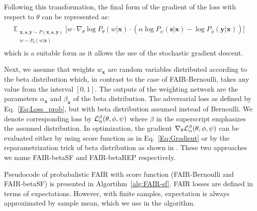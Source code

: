\documentclass[preprint,12pt]{elsarticle}
\begin{document}
Following this transformation, the final form of the gradient of the loss with respect to $\theta$ can be represented as:
\begin{align}
\label{Eq:Gradient}
\begin{split}
\mathbb{E}_{\substack{\mathbf{x}, \mathbf{s}, \mathbf{y}\sim P(\mathbf{x},\mathbf{s}, \mathbf{y})\\w \sim P_\theta(w|\mathbf{x})}} \Big[w\cdot \nabla_{\theta}  \log P_\theta(w|\mathbf{x}) \cdot (\alpha\log P_\psi(\mathbf{s}|\mathbf{x}) - \log P_\phi(\mathbf{y}|\mathbf{x})) \Big]
\end{split}
\end{align}
which is a suitable form as it allows the use of the stochastic gradient descent.

Next, we assume that weights $w_\mathbf{x}$ are random variables distributed according to the beta distribution which, in contrast to the case of FAIR-Bernoulli, takes any value from the interval $[0,1]$. The outputs of the weighting network are the parameters $\alpha_\mathbf{x}$ and $\beta_\mathbf{x}$ of the beta distribution. The adversarial loss as defined by Eq.~\ref{Eq:Loss_prob}, but with beta distribution assumed instead of Bernoulli. We denote corresponding loss by ${\cal L}^\beta_\alpha(\theta,\phi,\psi)$ where $\beta$ in the superscript emphasizes the assumed distribution. In optimization, the gradient $\nabla_{\theta}{\cal L}^\beta_{\alpha}(\theta, \phi, \psi)$
can be evaluated either by using score function as in Eq.~\ref{Eq:Gradient} or by the reparametrization trick of beta distribution as shown in \cite{shah2015empirical}. These two approaches we name FAIR-betaSF and FAIR-betaREP respectively.

Pseudocode of probabalistic FAIR with score function (FAIR-Bernoulli and FAIR-betaSF) is presented in Algortihm~\ref{alg:FAIR-sf}. FAIR losses are defined in terms of expectations. However, with finite samples, expectation is always approximated by sample mean, which we use in the algorithm.
\end{document}
